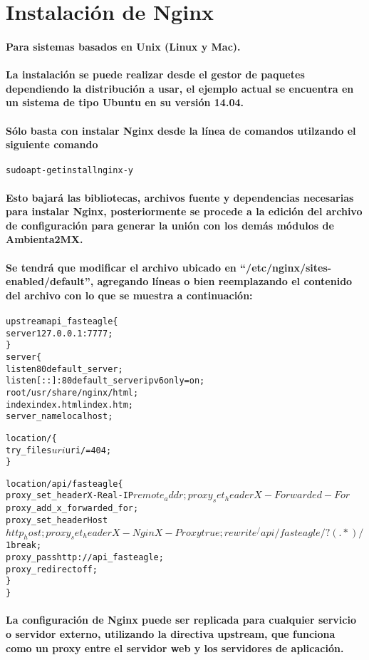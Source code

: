 %
%

\newpage
\section*{Instalación de Nginx}
	\paragraph{Para sistemas basados en Unix (Linux y Mac).}
	\paragraph{La instalación se puede realizar desde el gestor de paquetes dependiendo la distribución a usar, el ejemplo actual se encuentra en un sistema de tipo Ubuntu en su versión 14.04.}
	\paragraph{Sólo basta con instalar Nginx desde la línea de comandos utilzando el siguiente comando}
	\begin{alltt}
		sudo apt-get install nginx -y
	\end{alltt}
	\paragraph{Esto bajará las bibliotecas, archivos fuente y dependencias necesarias para instalar Nginx, posteriormente se procede a la edición del archivo de configuración para generar la unión con los demás módulos de Ambienta2MX.}
	\paragraph{Se tendrá que modificar el archivo ubicado en ``/etc/nginx/sites-enabled/default'', agregando líneas o bien reemplazando el contenido del archivo con lo que se muestra a continuación:}
	\begin{alltt}
		upstream api_fasteagle \{
		 server    127.0.0.1:7777;
		\}
		server \{
		 listen 80 default_server;
		 listen [::]:80 default_server ipv6only=on;
		 root /usr/share/nginx/html;
		 index index.html index.htm;
		 server_name localhost;

		 location / \{  
		  try_files $uri $uri/ =404;
		 \}

		 location /api/fasteagle \{
		    proxy_set_header X-Real-IP $remote_addr;
		    proxy_set_header X-Forwarded-For $proxy_add_x_forwarded_for;
		    proxy_set_header Host $http_host;
		    proxy_set_header X-NginX-Proxy true;
		    rewrite ^/api/fasteagle/?(.*) /$1 break;
		    proxy_pass http://api_fasteagle;
		    proxy_redirect off;
		  \}  
		\} 
	\end{alltt}
	\paragraph{La configuración de Nginx puede ser replicada para cualquier servicio o servidor externo, utilizando la directiva upstream, que funciona como un proxy entre el servidor web y los servidores de aplicación.}
